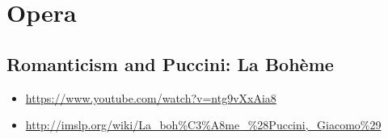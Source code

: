 
\chapter{Opera}
\label{opera}


\section{Romanticism and Puccini: La Boh\`eme}
\begin{itemize}
\item \url{https://www.youtube.com/watch?v=ntg9vXxAia8}
\item \url{http://imslp.org/wiki/La_boh%C3%A8me_%28Puccini,_Giacomo%29}
\end{itemize}

\begin{comment}
\subsection{Post-Beethoven}
What do we have?
More literary and romantic scenes (programmes).
Carl Maria von Weber (1786-1826). Der Freisch\"utz (1821) for which he is best known (though many of his piano works are excellent). The opera has the supernatural, magic and  the devil at its heart. There are elements of surrealism (dream-like fantasy). 

Current literature included Mary Shelley's Frankenstein (1818).  
\url{http://www.gutenberg.org/files/84/84-h/84-h.htm}

 
\end{comment}
